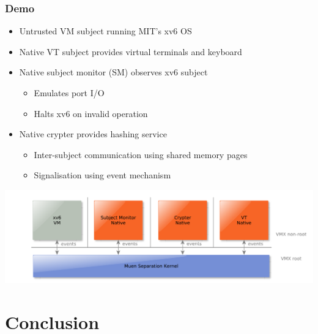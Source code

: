 \documentclass[xcolor={dvipsnames}]{beamer}
\begin{document}
\begin{frame}\frametitle{Demo}
\begin{itemize}
	\item Untrusted VM subject running MIT's xv6 OS
	\item Native VT subject provides virtual terminals and keyboard
	\item Native subject monitor (SM) observes xv6 subject
	\begin{itemize}
		\item Emulates port I/O
		\item Halts xv6 on invalid operation
	\end{itemize}
	\item Native crypter provides hashing service
	\begin{itemize}
		\item Inter-subject communication using shared memory pages
		\item Signalisation using event mechanism
	\end{itemize}
\end{itemize}
\begin{center}
	\includegraphics[width=\textwidth]{images/architecture-example_system.pdf}
\end{center}
\end{frame}

\section{Conclusion}
\end{document}
